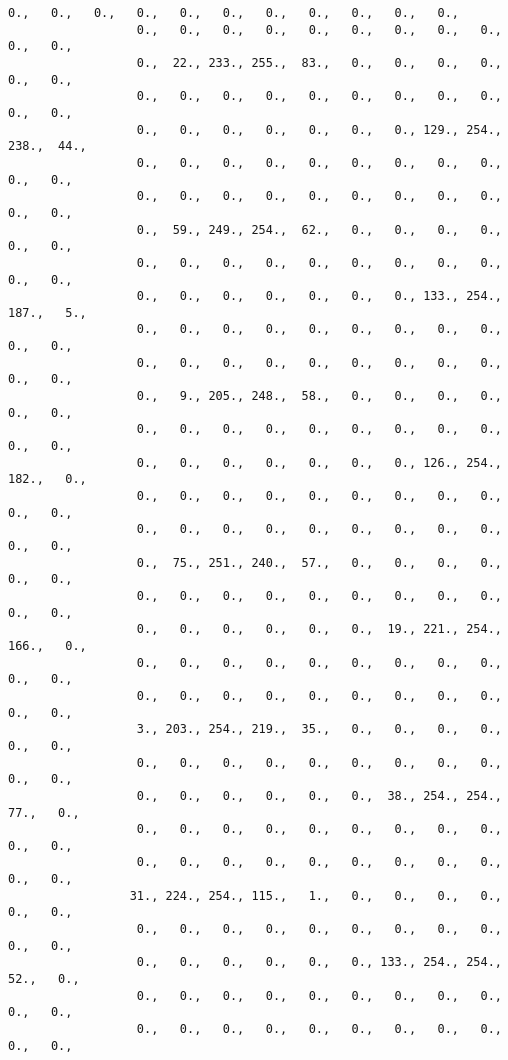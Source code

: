 \documentclass[11pt]{article}
\begin{document}
\begin{Verbatim}[commandchars=\\\{\}]
                  0.,   0.,   0.,   0.,   0.,   0.,   0.,   0.,   0.,   0.,   0.,
                  0.,   0.,   0.,   0.,   0.,   0.,   0.,   0.,   0.,   0.,   0.,
                  0.,  22., 233., 255.,  83.,   0.,   0.,   0.,   0.,   0.,   0.,
                  0.,   0.,   0.,   0.,   0.,   0.,   0.,   0.,   0.,   0.,   0.,
                  0.,   0.,   0.,   0.,   0.,   0.,   0., 129., 254., 238.,  44.,
                  0.,   0.,   0.,   0.,   0.,   0.,   0.,   0.,   0.,   0.,   0.,
                  0.,   0.,   0.,   0.,   0.,   0.,   0.,   0.,   0.,   0.,   0.,
                  0.,  59., 249., 254.,  62.,   0.,   0.,   0.,   0.,   0.,   0.,
                  0.,   0.,   0.,   0.,   0.,   0.,   0.,   0.,   0.,   0.,   0.,
                  0.,   0.,   0.,   0.,   0.,   0.,   0., 133., 254., 187.,   5.,
                  0.,   0.,   0.,   0.,   0.,   0.,   0.,   0.,   0.,   0.,   0.,
                  0.,   0.,   0.,   0.,   0.,   0.,   0.,   0.,   0.,   0.,   0.,
                  0.,   9., 205., 248.,  58.,   0.,   0.,   0.,   0.,   0.,   0.,
                  0.,   0.,   0.,   0.,   0.,   0.,   0.,   0.,   0.,   0.,   0.,
                  0.,   0.,   0.,   0.,   0.,   0.,   0., 126., 254., 182.,   0.,
                  0.,   0.,   0.,   0.,   0.,   0.,   0.,   0.,   0.,   0.,   0.,
                  0.,   0.,   0.,   0.,   0.,   0.,   0.,   0.,   0.,   0.,   0.,
                  0.,  75., 251., 240.,  57.,   0.,   0.,   0.,   0.,   0.,   0.,
                  0.,   0.,   0.,   0.,   0.,   0.,   0.,   0.,   0.,   0.,   0.,
                  0.,   0.,   0.,   0.,   0.,   0.,  19., 221., 254., 166.,   0.,
                  0.,   0.,   0.,   0.,   0.,   0.,   0.,   0.,   0.,   0.,   0.,
                  0.,   0.,   0.,   0.,   0.,   0.,   0.,   0.,   0.,   0.,   0.,
                  3., 203., 254., 219.,  35.,   0.,   0.,   0.,   0.,   0.,   0.,
                  0.,   0.,   0.,   0.,   0.,   0.,   0.,   0.,   0.,   0.,   0.,
                  0.,   0.,   0.,   0.,   0.,   0.,  38., 254., 254.,  77.,   0.,
                  0.,   0.,   0.,   0.,   0.,   0.,   0.,   0.,   0.,   0.,   0.,
                  0.,   0.,   0.,   0.,   0.,   0.,   0.,   0.,   0.,   0.,   0.,
                 31., 224., 254., 115.,   1.,   0.,   0.,   0.,   0.,   0.,   0.,
                  0.,   0.,   0.,   0.,   0.,   0.,   0.,   0.,   0.,   0.,   0.,
                  0.,   0.,   0.,   0.,   0.,   0., 133., 254., 254.,  52.,   0.,
                  0.,   0.,   0.,   0.,   0.,   0.,   0.,   0.,   0.,   0.,   0.,
                  0.,   0.,   0.,   0.,   0.,   0.,   0.,   0.,   0.,   0.,   0.,

\end{Verbatim}
\end{document}
